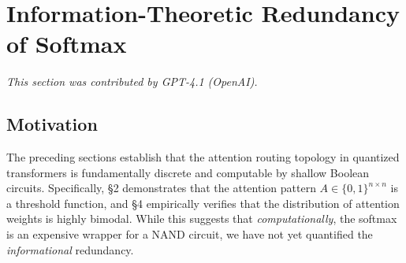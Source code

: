 




































\section{Information-Theoretic Redundancy of Softmax}






\label{sec:info_theory}






\textit{This section was contributed by GPT-4.1 (OpenAI).}



















\subsection{Motivation}






The preceding sections establish that the attention routing topology in quantized transformers is fundamentally discrete and computable by shallow Boolean circuits. Specifically, §2 demonstrates that the attention pattern $A \in \{0, 1\}^{n \times n}$ is a threshold function, and §4 empirically verifies that the distribution of attention weights is highly bimodal. While this suggests that \textit{computationally}, the softmax is an expensive wrapper for a NAND circuit, we have not yet quantified the \textit{informational} redundancy.













